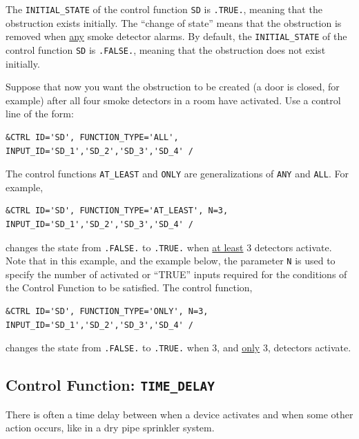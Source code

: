 \documentclass[11pt]{book}
\newcommand{\ct}{\tt\small}
\begin{document}
\noindent
The {\ct INITIAL\_STATE} of the control function {\ct SD} is {\ct .TRUE.},
meaning that the obstruction exists initially. The ``change of state'' means that the obstruction is
removed when \underline{any} smoke detector alarms.  By default, the {\ct INITIAL\_STATE}
of the control function {\ct SD} is {\ct .FALSE.}, meaning that the obstruction does not exist initially.

Suppose that now you want the obstruction to be created (a door is closed, for example) after all
four smoke detectors in a room have activated. Use a control line of the form:

\footnotesize
\begin{verbatim}
&CTRL ID='SD', FUNCTION_TYPE='ALL', INPUT_ID='SD_1','SD_2','SD_3','SD_4' /
\end{verbatim}
\normalsize

\noindent
The control functions {\ct AT\_LEAST} and {\ct ONLY} are generalizations of {\ct ANY} and {\ct ALL}. For example,

\footnotesize
\begin{verbatim}
&CTRL ID='SD', FUNCTION_TYPE='AT_LEAST', N=3, INPUT_ID='SD_1','SD_2','SD_3','SD_4' /
\end{verbatim}

\normalsize
\noindent
changes the state from {\ct .FALSE.} to {\ct .TRUE.} when \underline{at least}
3 detectors activate. Note that in this example, and the example below, the parameter {\ct N} is used to
specify the number of activated or ``TRUE'' inputs required for the conditions
of the Control Function to be satisfied. The control function,

\footnotesize
\begin{verbatim}
&CTRL ID='SD', FUNCTION_TYPE='ONLY', N=3, INPUT_ID='SD_1','SD_2','SD_3','SD_4' /
\end{verbatim}

\normalsize
\noindent
changes the state from {\ct .FALSE.} to {\ct .TRUE.} when 3,
and \underline{only} 3, detectors activate.


\subsection{Control Function: \texorpdfstring{{\tt TIME\_DELAY}}{TIME\_DELAY}}

\label{info:TIME_DELAY}

There is often a time delay between when a device activates and when some other action occurs, like in a dry pipe sprinkler system.
\end{document}
